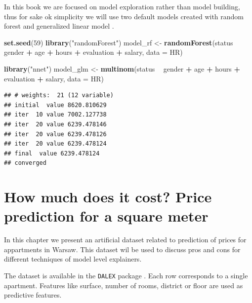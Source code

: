 \documentclass[]{book}
\newenvironment{Shaded}{\begin{snugshade}}{\end{snugshade}}
\newcommand{\DataTypeTok}[1]{\textcolor[rgb]{0.13,0.29,0.53}{#1}}
\newcommand{\DecValTok}[1]{\textcolor[rgb]{0.00,0.00,0.81}{#1}}
\newcommand{\KeywordTok}[1]{\textcolor[rgb]{0.13,0.29,0.53}{\textbf{#1}}}
\newcommand{\NormalTok}[1]{#1}
\newcommand{\OperatorTok}[1]{\textcolor[rgb]{0.81,0.36,0.00}{\textbf{#1}}}
\newcommand{\StringTok}[1]{\textcolor[rgb]{0.31,0.60,0.02}{#1}}
\theoremstyle{definition}
\theoremstyle{definition}
\theoremstyle{definition}
\theoremstyle{remark}
\begin{document}
In this book we are focused on model exploration rather than model
building, thus for sake ok simplicity we will use two default models
created with random forest \citep{R-randomForest} and generalized linear
model \citep{R-nnet}.

\begin{Shaded}
\begin{Highlighting}[]
\KeywordTok{set.seed}\NormalTok{(}\DecValTok{59}\NormalTok{)}
\KeywordTok{library}\NormalTok{(}\StringTok{"randomForest"}\NormalTok{)}
\NormalTok{model_rf <-}\StringTok{ }\KeywordTok{randomForest}\NormalTok{(status }\OperatorTok{~}\StringTok{ }\NormalTok{gender }\OperatorTok{+}\StringTok{ }\NormalTok{age }\OperatorTok{+}\StringTok{ }\NormalTok{hours }\OperatorTok{+}\StringTok{ }\NormalTok{evaluation }\OperatorTok{+}\StringTok{ }\NormalTok{salary, }\DataTypeTok{data =}\NormalTok{ HR)}

\KeywordTok{library}\NormalTok{(}\StringTok{"nnet"}\NormalTok{)}
\NormalTok{model_glm <-}\StringTok{ }\KeywordTok{multinom}\NormalTok{(status }\OperatorTok{~}\StringTok{ }\NormalTok{gender }\OperatorTok{+}\StringTok{ }\NormalTok{age }\OperatorTok{+}\StringTok{ }\NormalTok{hours }\OperatorTok{+}\StringTok{ }\NormalTok{evaluation }\OperatorTok{+}\StringTok{ }\NormalTok{salary, }\DataTypeTok{data =}\NormalTok{ HR)}
\end{Highlighting}
\end{Shaded}

\begin{verbatim}
## # weights:  21 (12 variable)
## initial  value 8620.810629 
## iter  10 value 7002.127738
## iter  20 value 6239.478146
## iter  20 value 6239.478126
## iter  20 value 6239.478124
## final  value 6239.478124 
## converged
\end{verbatim}

\hypertarget{apartmentsDataset}{%
\section{How much does it cost? Price prediction for a square
meter}\label{apartmentsDataset}}

In this chapter we present an artificial dataset related to prediction
of prices for appartments in Warsaw. This dataset wil be used to discuss
pros and cons for different techniques of model level explainers.

The dataset is available in the \texttt{DALEX} package \citep{R-DALEX}.
Each row corresponds to a single apartment. Features like surface,
number of rooms, district or floor are used as predictive features.
\end{document}
